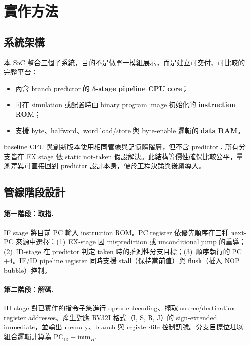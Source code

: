\documentclass[12pt,a4paper]{article}
\begin{document}
	\section{實作方法}
	\label{sec:method}

	\subsection{系統架構}
	\label{sec:architecture}

	本 SoC 整合三個子系統，目的不是做單一模組展示，而是建立可交付、可比較的完整平台：

	\begin{itemize}
		\item 內含 branch predictor 的 \textbf{5-stage pipeline CPU core}；
		\item 可在 simulation 或配置時由 binary program image 初始化的 \textbf{instruction ROM}；
		\item 支援 byte、halfword、word load/store 與 byte-enable 邏輯的 \textbf{data RAM}。
	\end{itemize}

	baseline CPU 與創新版本使用相同管線與記憶體階層，但不含 predictor：所有分支皆在 EX stage 依 static not-taken 假設解決。此結構等價性確保比較公平，量測差異可直接回到 predictor 設計本身，便於工程決策與後續導入。

	\subsection{管線階段設計}
	\label{sec:modules}

	\paragraph{第一階段：取指.}
	IF stage 將目前 PC 輸入 instruction ROM。PC register 依優先順序在三種 next-PC 來源中選擇：(1)~EX-stage 因 misprediction 或 unconditional jump 的重導；(2)~ID-stage 在 predictor 判定 taken 時的推測性分支目標；(3)~順序執行的 PC$+4$。IF/ID pipeline register 同時支援 stall（保持當前值）與 flush（插入 NOP bubble）控制。

	\paragraph{第二階段：解碼.}
	ID stage 對已實作的指令子集進行 opcode decoding、擷取 source/destination register addresses、產生對應 RV32I 格式（I, S, B, J）的 sign-extended immediate，並輸出 memory、branch 與 register-file 控制訊號。分支目標位址以組合邏輯計算為
	$\mathrm{PC}_\mathrm{ID} + \mathrm{imm}_{B}$.
\end{document}
